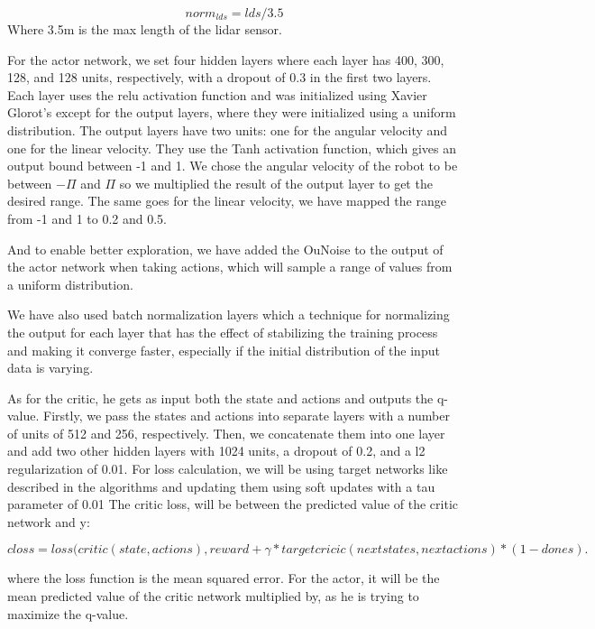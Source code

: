 \documentclass[12pt]{extarticle}
\begin{document}
 \begin{equation} \label{angle_norm}
     norm_{lds}=lds/3.5 
   \end{equation}
  Where 3.5m is the max length of the lidar sensor.
   
For the actor network, we set four hidden layers where each layer has 400, 300, 128, and 128 units, respectively, with a dropout of 0.3 in the first two layers. Each layer uses the relu activation function and was initialized using Xavier Glorot's except for the output layers, where they were initialized using a uniform distribution. The output layers have two units: one for the angular velocity and one for the linear velocity. They use the Tanh activation function, which gives an output bound between -1 and 1. We chose the angular velocity of the robot to be between $-\Pi $ and $\Pi $ so we multiplied the result of the output layer to get the desired range. The same goes for the linear velocity, we have mapped the range from -1 and 1 to 0.2 and 0.5.

And to enable better exploration, we have added the OuNoise to the output of the actor network when taking actions, which will sample a range of values from a uniform distribution.


We have also used batch normalization layers \cite{ioffe2015batch} which a technique for normalizing the output for each layer that has the effect of stabilizing the training process and making it converge faster, especially if the initial distribution of the input data is varying.

As for the critic, he gets as input both the state and actions and outputs the q-value. Firstly, we pass the states and actions into separate layers with a number of units of 512 and 256, respectively. Then, we concatenate them into one layer and add two other hidden layers with 1024 units, a dropout of 0.2, and a l2 regularization of 0.01.
For loss calculation, we will be using target networks like described in the algorithms and updating them using soft updates with a tau parameter of 0.01
The critic loss, will be between the predicted value of the critic network and y:
 

     \begin{equation} \label{critic_loss}
     closs= loss(critic(state,actions),reward+ \gamma*targetcricic(nextstates,nextactions)*(1-dones).
   \end{equation}
 
where the loss function is the mean squared error.
For the actor, it will be the mean predicted value of the critic network multiplied by, as he is trying to maximize the q-value.
\end{document}

